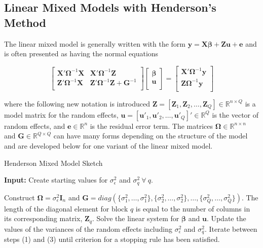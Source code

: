 \documentclass[12pt]{article}
\begin{document}
\subsection*{Linear Mixed Models with Henderson's Method}

The linear mixed model is generally written with the form $\bm{y} = \bm{X}\bm{\beta} + \bm{Z}\bm{u} + \bm{e}$ \cite{laird:ware} and is often presented as having the normal equations \cite{henderson}

\begin{equation}
\label{eqn:henderson:eiv}
\left [ 
\begin{array}{cc}
\bm{X'}\bm{\Omega}^{-1}\bm{X} & \bm{X'}\bm{\Omega}^{-1}\bm{Z}\\
\bm{Z}'\bm{\Omega}^{-1}\bm{X} & \bm{Z}'\bm{\Omega}^{-1}\bm{Z} + \bm{G}^{-1}\\
\end{array}
\right ]
\left [ 
\begin{array}{c}
\bm{\beta}\\
\bm{u}\\
\end{array}
\right ] = 
\left [ 
\begin{array}{c}
\bm{X'}\bm{\Omega}^{-1}\bm{y} \\
\bm{Z}\bm{\Omega}^{-1}\bm{y}\\
\end{array}
\right] 
\end{equation}


\noindent where the following new notation is introduced $\bm{Z} = [\bm{Z}_1, \bm{Z}_2, \ldots, \bm{Z}_Q] \in \mathbb{R}^{n \times Q}$ is a model matrix for the random effects, $\bm{u} = [\bm{u}'_1, \bm{u}'_2, \ldots, \bm{u}'_Q]' \in \mathbb{R}^Q$ is the vector of random effects, and $\bm{e} \in \mathbb{R}^n$ is the residual error term. The matrices $\bm{\Omega} \in \mathbb{R}^{n \times n}$ and $\bm{G} \in \mathbb{R}^{Q \times Q}$ can have many forms depending on the structure of the model and are developed below for one variant of the linear mixed model. 

\begin{algorithm}
\caption{Henderson Mixed Model Sketch}
\label{algo:a}
	\hspace*{\algorithmicindent} \textbf{Input:} Create starting values for $\sigma^2_{\epsilon}$ and $\sigma^2_{q} \ \forall \ q$.
\begin{algorithmic}[1]
	\State Construct $\bm{\Omega} = \sigma^2_{\epsilon}\bm{I}_n$ and $\bm{G}=diag(\{\sigma^2_{1}, \ldots, \sigma^2_{1}\}, \{\sigma^2_{2}, \ldots, \sigma^2_{2}\}, \ldots, \{\sigma^2_{Q}, \ldots, \sigma^2_{Q}\} )$. The length of the diagonal element for block $q$ is equal to the number of columns in its corresponding matrix, $\bm{Z}_q$.
	\State Solve the linear system for $\bm{\beta}$ and $\bm{u}$.
	\State Update the values of the variances of the random effects including $\sigma^2_{\epsilon}$ and $\sigma^2_{q}$.
	\State Iterate between steps (1) and (3) until criterion for a stopping rule has been satisfied. 
\end{algorithmic}
\end{algorithm}
\end{document}

